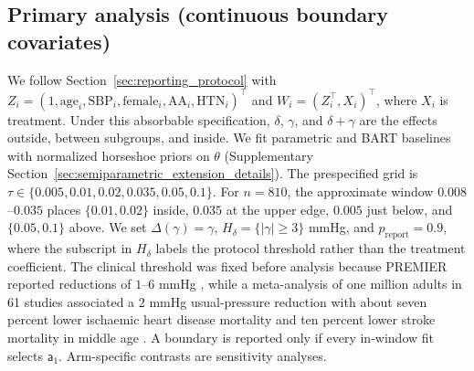 \documentclass[11pt]{article}
\theoremstyle{definition}
\theoremstyle{plain}
\begin{document}
\subsection{Primary analysis (continuous boundary covariates)}
\label{sec:analysis_result}
We follow Section~\ref{sec:reporting_protocol} with $Z_i=(1,\mathrm{age}_i,\mathrm{SBP}_i,\mathrm{female}_i,\mathrm{AA}_i,\mathrm{HTN}_i)^\top$ and $W_i=(Z_i^\top,X_i)^\top$, where $X_i$ is treatment. Under this absorbable specification, $\delta$, $\gamma$, and $\delta+\gamma$ are the effects outside, between subgroups, and inside. We fit parametric and BART baselines with normalized horseshoe priors on $\theta$ (Supplementary Section~\ref{sec:semiparametric_extension_details}). The prespecified grid is $\tau\in\{0.005,0.01,0.02,0.035,0.05,0.1\}$. For $n=810$, the approximate window $0.008$--$0.035$ places $\{0.01,0.02\}$ inside, $0.035$ at the upper edge, $0.005$ just below, and $\{0.05,0.1\}$ above. We set $\Delta(\gamma)=\gamma$, $H_\delta=\{|\gamma|\ge3\}$ mmHg, and $p_{\mathrm{report}}=0.9$, where the subscript in $H_\delta$ labels the protocol threshold rather than the treatment coefficient. The clinical threshold was fixed before analysis because PREMIER reported reductions of $1$--$6$ mmHg \citep{Svetkey2005}, while a meta-analysis of one million adults in 61 studies associated a $2$ mmHg usual-pressure reduction with about seven percent lower ischaemic heart disease mortality and ten percent lower stroke mortality in middle age \citep{Lewington2002}. A boundary is reported only if every in-window fit selects $\mathsf a_1$. Arm-specific contrasts are sensitivity analyses.
\end{document}
